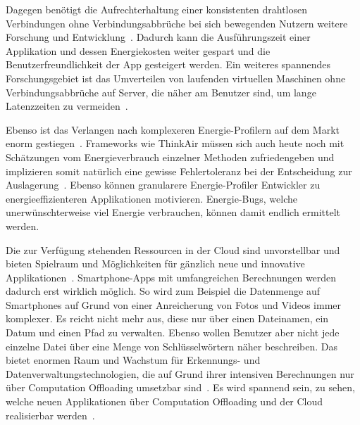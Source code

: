 \documentclass{sigchi}
\begin{document}
Dagegen benötigt die Aufrechterhaltung einer konsistenten drahtlosen Verbindungen ohne Verbindungsabbrüche bei sich bewegenden Nutzern weitere Forschung und Entwicklung~\cite{o11}.
Dadurch kann die Ausführungszeit einer Applikation und dessen Energiekosten weiter gespart und die Benutzerfreundlichkeit der App gesteigert werden.
Ein weiteres spannendes Forschungsgebiet ist das Umverteilen von laufenden virtuellen Maschinen ohne Verbindungsabbrüche auf Server, die näher am Benutzer sind, um lange Latenzzeiten zu vermeiden~\cite{o11}.

Ebenso ist das Verlangen nach komplexeren Energie-Profilern auf dem Markt enorm gestiegen~\cite{o12}.
Frameworks wie ThinkAir müssen sich auch heute noch mit Schätzungen vom Energieverbrauch einzelner Methoden zufriedengeben und implizieren somit natürlich eine gewisse Fehlertoleranz bei der Entscheidung zur Auslagerung~\cite{thinkair}.
Ebenso können granularere Energie-Profiler Entwickler zu energieeffizienteren Applikationen motivieren.
Energie-Bugs, welche unerwünschterweise viel Energie verbrauchen, können damit endlich ermittelt werden.

Die zur Verfügung stehenden Ressourcen in der Cloud sind unvorstellbar und bieten Spielraum und Möglichkeiten für gänzlich neue und innovative Applikationen~\cite{o12}.
Smartphone-Apps mit umfangreichen Berechnungen werden dadurch erst wirklich möglich.
So wird zum Beispiel die Datenmenge auf Smartphones auf Grund von einer Anreicherung von Fotos und Videos immer komplexer.
Es reicht nicht mehr aus, diese nur über einen Dateinamen, ein Datum und einen Pfad zu verwalten.
Ebenso wollen Benutzer aber nicht jede einzelne Datei über eine Menge von Schlüsselwörtern näher beschreiben.
Das bietet enormen Raum und Wachstum für Erkennungs- und Datenverwaltungstechnologien, die auf Grund ihrer intensiven Berechnungen nur über Computation Offloading umsetzbar sind~\cite{o12}.
Es wird spannend sein, zu sehen, welche neuen Applikationen über Computation Offloading und der Cloud realisierbar werden~\cite{o12}.



\end{document}
